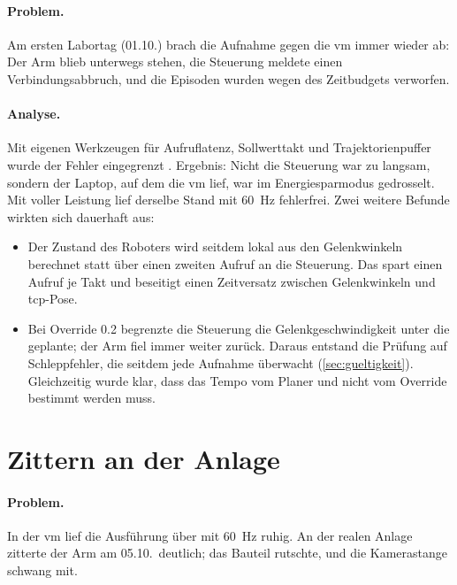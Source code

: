 \paragraph{Problem.} Am ersten Labortag (01.10.) brach die Aufnahme gegen die \ac{vm} immer
wieder ab: Der Arm blieb unterwegs stehen, die Steuerung meldete einen Verbindungsabbruch, und
die Episoden wurden wegen des Zeitbudgets verworfen.

\paragraph{Analyse.} Mit eigenen Werkzeugen für Aufruflatenz, Sollwerttakt und
Trajektorienpuffer wurde der Fehler eingegrenzt .
Ergebnis: Nicht die Steuerung war zu langsam, sondern der Laptop, auf dem die \ac{vm} lief, war
im Energiesparmodus gedrosselt. Mit voller Leistung lief derselbe Stand mit \SI{60}{\hertz}
fehlerfrei. Zwei weitere Befunde wirkten sich dauerhaft aus:
\begin{itemize}
  \item Der Zustand des Roboters wird seitdem lokal aus den Gelenkwinkeln berechnet statt
    über einen zweiten Aufruf an die Steuerung. Das spart einen Aufruf je Takt und beseitigt
    einen Zeitversatz zwischen Gelenkwinkeln und \ac{tcp}-Pose.
  \item Bei Override \num{0.2} begrenzte die Steuerung die Gelenkgeschwindigkeit unter die
    geplante; der Arm fiel immer weiter zurück. Daraus entstand die Prüfung auf Schleppfehler,
    die seitdem jede Aufnahme überwacht (\cref{sec:gueltigkeit}). Gleichzeitig wurde klar,
    dass das Tempo vom Planer und nicht vom Override bestimmt werden muss.
\end{itemize}

\section{Zittern an der Anlage}
\label{sec:zittern}

\paragraph{Problem.} In der \ac{vm} lief die Ausführung über  mit
\SI{60}{\hertz} ruhig. An der realen Anlage zitterte der Arm am 05.10.\ deutlich; das Bauteil
rutschte, und die Kamerastange schwang mit.

